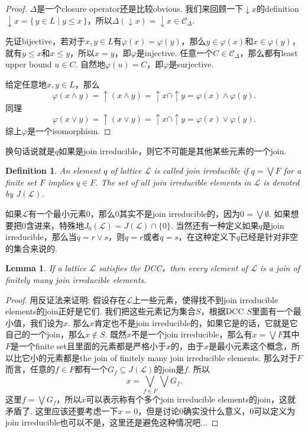 \documentclass{article}
\newtheorem{lemma}[theorem]{Lemma}
\newtheorem{definition}[theorem]{Definition}
\newcommand\Set[2]{\{\,#1\mid#2\,\}} %
\newcommand\lattice{\mathcal{L}}
\begin{document}
\begin{proof}
$\Delta$是一个closure operator还是比较obvious. 我们来回顾一下$\downarrow x$的definition $\downarrow x = \Set{y \in L}{ y \leq x}$，所以$\Delta(\downarrow x) = \downarrow x \in \mathcal{C}_{\Delta}$.

先证bijective，若对于$x,y \in L$有$\varphi(x) = \varphi(y)$，那么$y \in \varphi(x)$和$x \in \varphi(y)$，就有$y \leq x$和$x \leq y$，所以$x = y$，即$\varphi$是injective. 任意一个$C \in \mathcal{C}_{\Delta}$，那么都有least upper bound $u \in C$. 自然地$\varphi(u) = C$，即$\varphi$是surjective.

给定任意地$x,y \in L$，那么
$$
\varphi(x \wedge y) = \uparrow (x \wedge y) = \uparrow x \cap \uparrow y = \varphi(x) \wedge \varphi(y).
$$
同理
$$
\varphi(x \vee y) = \uparrow (x \vee y) = \uparrow x \cap \uparrow y = \varphi(x) \vee \varphi(y).
$$
综上$\varphi$是一个isomorphism.
\end{proof}


{\color{blue} 换句话说就是$q$如果是join irreducible，则它不可能是其他某些元素的一个join}. 

\begin{definition}
\rm An element $q$ of lattice $\lattice$ is called {\color{red} join irreducible} if $q = \bigvee F$ for a {\color{red} finite set} $F$ implies $q \in F$. The set of all join irreducible elements in $\lattice$ is denoted by $J(\lattice)$.
\end{definition}

{\color{red} 如果$\lattice$有一个最小元素0，那么0其实不是join irreducible的，因为$0 = \bigvee \emptyset$. 如果想要把0含进来，特殊地$J_0(\lattice) =J(\lattice) \cap \{0\}$. 当然还有一种定义如果$q$是join irreducible，那么当$q = r \vee s$，则$q = r$或者$q =s$，在这种定义下$q$已经是针对非空的集合来说的}. 

\begin{lemma}
\rm If a lattice $\lattice$ satisfies the DCC，then every element of $\lattice$ is a join of finitely many join irreducible elements.
\end{lemma}

\begin{proof}
用反证法来证明: 假设存在$\lattice$上一些元素，使得找不到join irreducible elements的join正好是它们. 我们把这些元素记为集合$S$，根据DCC $S$里面有一个最小值，我们设为$x$. 那么$x$肯定也不是join irreducible的，如果它是的话，它就是它自己的一个join，那么$x \notin S$. 既然$x$不是一个join irreducible，那么有$x = \bigvee F$其中$F$是一个finite set且里面的元素都是严格小于$x$的，由于$x$是最小元素这个概念，所以比它小的元素都是the join of finitely many join irreducible elements. 那么对于$F$而言，任意的$f \in F$都有一个$G_f \subseteq J(\lattice)$的join是$f$. 所以
$$
x = \bigvee\limits_{f \in F}\bigvee G_f.
$$
这里$f = \bigvee G_f$，所以$x$可以表示称有个多个join irreducible elements的join，这就矛盾了. 这里应该还要考虑一下$x = 0$，但是讨论0确实没什么意义，0可以定义为join irreducible也可以不是，这里还是避免这种情况吧...
\end{proof}
\end{document}
